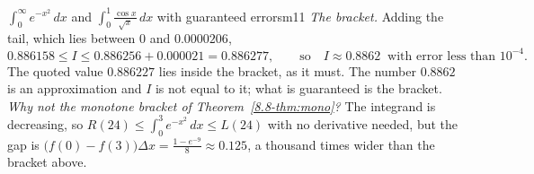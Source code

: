 \documentclass[11pt]{article}
\begin{document}
\begin{exmp}{$\displaystyle\int_0^\infty e^{-x^2}\,dx$ and $\displaystyle\int_0^1\frac{\cos x}{\sqrt x}\,dx$ with guaranteed errors}{m11}
\emph{The bracket.} Adding the tail, which lies between $0$ and $0.0000206$,
\[0.886158\le I\le0.886256+0.000021=0.886277,\qquad\text{so}\quad I\approx0.8862\ \text{ with error less than }10^{-4}.\]
The quoted value $0.886227$ lies inside the bracket, as it must. The number $0.8862$ is an approximation and $I$ is not equal to it; what is guaranteed is the bracket. \emph{Why not the monotone bracket of Theorem~\ref{8.8-thm:mono}?} The integrand is decreasing, so $R(24)\le\int_0^3e^{-x^2}\,dx\le L(24)$ with no derivative needed, but the gap is $\big(f(0)-f(3)\big)\Delta x=\frac{1-e^{-9}}8\approx0.125$, a thousand times wider than the bracket above.


\end{exmp}
\end{document}
